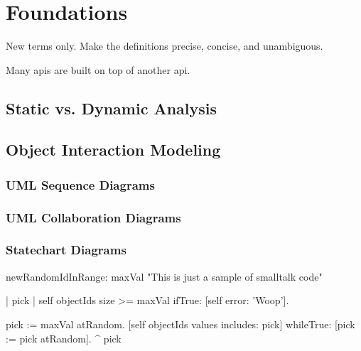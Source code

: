 \chapter{Foundations}
\label{c:Foundations}

New terms only. Make the definitions precise, concise, and unambiguous.

Many \acp{api} are built on top of another \ac{api}.

\section{Static vs. Dynamic Analysis}

\section{Object Interaction Modeling}
\subsection{UML Sequence Diagrams}
\subsection{UML Collaboration Diagrams}
\subsection{Statechart Diagrams}

\begin{smalltalk}[float=htbp,caption=Smalltalk Sample]
newRandomIdInRange: maxVal
	"This is just a sample of smalltalk code"
	
	| pick |
	self objectIds size >= maxVal ifTrue: [self error: 'Woop'].
	
	pick := maxVal atRandom.
	[self objectIds values includes: pick] 
		whileTrue: [pick := pick atRandom].
	^  pick
\end{smalltalk}
